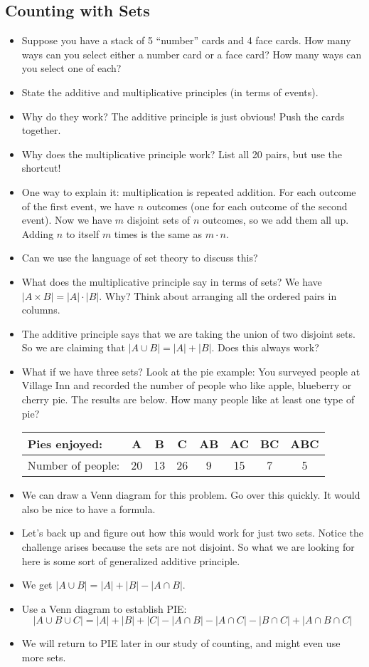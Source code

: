 \documentclass[12pt]{article}
\theoremstyle{plain}
\theoremstyle{definition}
\theoremstyle{remark}
\begin{document}
 \subsection*{Counting with Sets}
 \begin{itemize}
   \item Suppose you have a stack of 5 ``number'' cards and 4 face cards.  How many ways can you select either a number card or a face card?  How many ways can you select one of each?
 	\item State the additive and multiplicative principles (in terms of events).
   \item Why do they work?  The additive principle is just obvious! Push the cards together.
   \item Why does the multiplicative principle work?  List all 20 pairs, but use the shortcut!
   \item One way to explain it: multiplication is repeated addition.  For each outcome of the first event, we have $n$ outcomes (one for each outcome of the second event).  Now we have $m$ disjoint sets of $n$ outcomes, so we add them all up.  Adding $n$ to itself $m$ times is the same as $m \cdot n$.
\item Can we use the language of set theory to discuss this?
\item What does the multiplicative principle say in terms of sets?  We have $|A \times B| = |A|\cdot |B|$.  Why?  Think about arranging all the ordered pairs in columns.
\item The additive principle says that we are taking the union of two disjoint sets.  So we are claiming that $|A \cup B| = |A| + |B|$.  Does this always work?

	\item What if we have three sets?  Look at the pie example:  You surveyed people at Village Inn and recorded the number of people who like apple, blueberry or cherry pie.  The results are below.  How many people like at least one type of pie?
	\begin{center}
\begin{tabular}{|l|c|c|c|c|c|c|c|}
	\hline
	 Pies enjoyed: & A & B & C & AB & AC & BC & ABC\\
	\hline
	Number of people: & 20 & 13 & 26 & 9 & 15 & 7 & 5\\
	\hline
	\end{tabular}
	\end{center}
	\item We can draw a Venn diagram for this problem.  Go over this quickly.  It would also be nice to have a formula.
	\item Let's back up and figure out how this would work for just two sets.  Notice the challenge arises because the sets are not disjoint.  So what we are looking for here is some sort of generalized additive principle.
	\item We get $|A \cup B| = |A| + |B| - |A \cap B|$.
	\item Use a Venn diagram to establish PIE: \[|A \cup B \cup C| = |A| + |B| + |C| - |A \cap B| - |A \cap C| - |B \cap C| + |A \cap B \cap C|\]
	\item We will return to PIE later in our study of counting, and might even use more sets.


\end{itemize}
\end{document}
